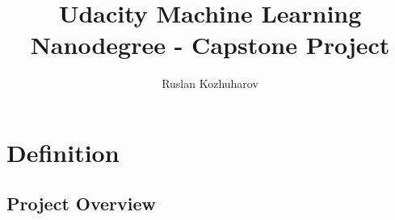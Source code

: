 \documentclass{article}
\title{Udacity Machine Learning Nanodegree - Capstone Project}
\author{Ruslan Kozhuharov}
\begin{document}
\maketitle
\tableofcontents
\newpage
{}

\section{Definition}
\subsection{Project Overview}
\end{document}
